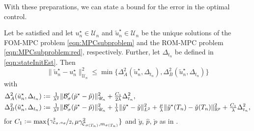 \documentclass[reqno]{amsart}
\newcommand{\U}{{\mathscr U}}
\newcommand{\R}{\mathbb R}
\newcommand{\adState}{p}
\newcommand{\inpVar}{u}
\newcommand{\outVar}{y}
\newcommand{\outVarDim}{p}
\newcommand{\bOper}{\calB}
\newcommand{\cOper}{\calC}
\newcommand{\initBound}{\initBoundn{n}}%
\newcommand{\initBoundn}[1]{\Delta_{t_{#1}}}
\newcommand{\optInpVar}[1]{\inpVar_{#1}^\star}
\newcommand{\optInpVarN}{\optInpVar{n}}
\newcommand{\switch}{\sigma}
\newcommand{\reduce}[1]{\tilde{#1}}
\newcommand{\BoundControlA}{\Delta_{A}}
\newcommand{\BoundControlB}{\Delta_{B}}
\newcommand{\adStateRed}{\reduce{\adState}}
\newcommand{\outVarRed}{\reduce{\outVar}}
\newcommand{\optAdStateRed}{\adStateRed^\star}
\newcommand{\optInpVarRed}[1]{\reduce{\inpVar}_{#1}^\star}
\newcommand{\optInpVarRedN}{\optInpVarRed{n}}
\newcommand{\optOutVarRed}{\outVarRed^\star}
\newcommand{\intermediateAdStateA}{{\hat \adState}}
\newcommand{\intermediateAdStateB}{\check{\adState}}
\newcommand{\intermediateOutVar}{\check{\outVar}}
\newcommand{\calB}{\mathcal{B}}
\newcommand{\calC}{\mathcal{C}}
\newcommand{\abbr}[1]{\textsf{#1}\xspace}
\newcommand{\FOM}{\abbr{FOM}}
\newcommand{\ROM}{\abbr{ROM}}
\newcommand{\MPC}{\abbr{MPC}}
\begin{document}
%
With these preparations, we can state a bound for the error in the optimal control.
%
\begin{theorem}
	\label{thm:apostErrorControl}
   Let  be satisfied and let $\optInpVarN \in \U_n$ and $\optInpVarRedN \in \U_n$ be the unique solutions of the \FOM-\MPC problem \eqref{eqn:MPCsubproblem} and the \ROM-\MPC problem \eqref{eqn:MPCsubproblem:red}, respectively. {Further, let $\initBound$ be defined in \eqref{eqn:stateInitEst}}. Then
   \begin{equation}
        \label{eq: a post estimate general all adjoint}
        \|\optInpVarRedN - \optInpVarN\|^2_{\U_n}
    	\leq \min\{ \BoundControlA^2(\optInpVarRedN, \initBound), \BoundControlB^2(\optInpVarRedN, \initBound)\}
    \end{equation}
     with
     \begin{align}
        \BoundControlA^2(\optInpVarRedN, \initBound) &\vcentcolon= \tfrac{1}{\lambda^2}\|\mathcal B_{\sigma}'(\optAdStateRed- \intermediateAdStateA)\|^2_{\U_n} + \tfrac{C_1}{2\lambda}\initBound^2,\label{control:bound:A}\\
        \BoundControlB^2(\optInpVarRedN, \initBound) &\vcentcolon= \tfrac{1}{\lambda^2} \|\bOper_{\switch}' (\optAdStateRed-\intermediateAdStateB)\|_{\U_n}^2  + \tfrac{1}{\lambda}\|\optOutVarRed - \intermediateOutVar\|_{L^2}^2+ \tfrac{\mu}{\lambda}\|\optOutVarRed(T_n)-\intermediateOutVar(T_n)\|_{\R^{\outVarDim}}^2+\tfrac{C_1}{\lambda}\initBound^2,\label{control:bound:B}
     \end{align}
     for $C_1\vcentcolon=\max\{\nicefrac{\gamma^2_{\cOper_{\switch},{a}_{\switch}}}{2},\mu \gamma^2_{\cOper_{\sigma(T_n)},m_{\switch(T_n)}}\}$ and $\intermediateOutVar$, $\intermediateAdStateA$, $\intermediateAdStateB$ as in .
\end{theorem} 
%
\end{document}
